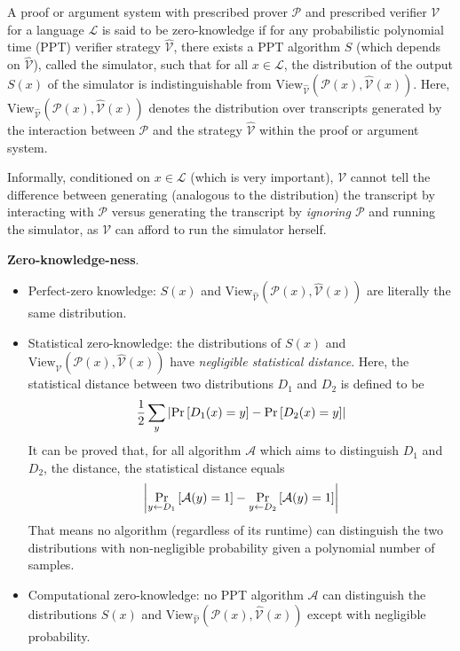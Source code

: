 \documentclass{article}
\begin{document}
\begin{boxx1}
A proof or argument system with prescribed prover $\mathcal{P}$ and prescribed verifier $\mathcal{V}$ for a language $\mathcal{L}$ is said to be zero-knowledge if for any probabilistic polynomial time (PPT) verifier strategy $\hat{\mathcal{V}}$, there exists a PPT algorithm $S$ (which depends on $\hat{\mathcal{V}}$), called the simulator, such that for all $x \in \mathcal{L}$, the distribution of the output $S(x)$ of the simulator is indistinguishable from $\text{View}_{\hat{\mathcal{V}}}(\mathcal{P}(x), \hat{\mathcal{V}}(x))$. Here, $\text{View}_{\hat{\mathcal{V}}}(\mathcal{P}(x), \hat{\mathcal{V}}(x))$ denotes the distribution over transcripts generated by the interaction between $\mathcal{P}$ and the strategy $\hat{\mathcal{V}}$ within the proof or argument system.
\end{boxx1}

Informally, conditioned on $x \in \mathcal{L}$ (which is very important), $\mathcal{V}$ cannot tell the difference between generating (analogous to the distribution) the transcript by interacting with $\mathcal{P}$ versus generating the transcript by \textit{ignoring $\mathcal{P}$} and running the simulator, as $\mathcal{V}$ can afford to run the simulator herself. 

\textbf{Zero-knowledge-ness}. 

\begin{itemize}
\item Perfect-zero knowledge: $S(x)$ and $\text{View}_{\hat{\mathcal{V}}}(\mathcal{P}(x), \hat{\mathcal{V}}(x))$ are literally the same distribution. 
\item Statistical zero-knowledge: the distributions of $S(x)$ and $\text{View}_{\hat{\mathcal{V}}}(\mathcal{P}(x), \hat{\mathcal{V}}(x))$ have \textit{negligible statistical distance}. Here, the statistical distance between two distributions $D_1$ and $D_2$ is defined to be
\begin{equation*}
\frac{1}{2} \sum_y \abs{\operatorname{Pr} \left[ D_1(x) = y \right] - \operatorname{Pr} \left[ D_2(x) = y \right]}
\end{equation*}
It can be proved that, for all algorithm $\mathcal{A}$ which aims to distinguish $D_1$ and $D_2$, the distance, the statistical distance equals 
\begin{equation*}
\abs{\mathop{\operatorname{Pr}}_{y \leftarrow D_1} \left[ \mathcal{A}(y) = 1 \right] - \mathop{\operatorname{Pr}}_{y \leftarrow D_2} \left[ \mathcal{A}(y) = 1  \right]}
\end{equation*}
That means no algorithm (regardless of its runtime) can distinguish the two distributions with non-negligible probability given a polynomial number of samples.

\item Computational zero-knowledge: no PPT algorithm $\mathcal{A}$ can distinguish the distributions $S(x)$ and $\text{View}_{\hat{\mathcal{V}}}(\mathcal{P}(x), \hat{\mathcal{V}}(x))$ except with negligible probability.
\end{itemize}
\end{document}
